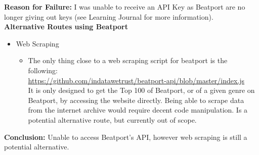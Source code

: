 \documentclass{article}
\begin{document}
\textbf{Reason for Failure:} I was unable to receive an API Key as Beatport are no longer giving out keys (see Learning Journal for more information).\\
\textbf{Alternative Routes using Beatport}
\begin{itemize}
    \item Web Scraping
    \begin{itemize}
        \item The only thing close to a web scraping script for beatport is the following:\\
        \url{https://github.com/indatawetrust/beatport-api/blob/master/index.js}\\
        It is only designed to get the Top 100 of Beatport, or of a given genre on Beatport, by accessing the website directly. Being able to scrape data from the internet archive would require decent code manipulation. Is a potential alternative route, but currently out of scope.
    \end{itemize}
\end{itemize}
\textbf{Conclusion:} Unable to access Beatport's API, however web scraping is still a potential alternative.
\end{document}

